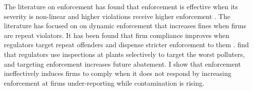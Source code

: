 \documentclass[12pt]{article}
\begin{document}

The literature on enforcement has found that enforcement is effective when its severity is non-linear and higher violations receive higher enforcement \parencite{harford1987self}. The literature has focused on on dynamic enforcement that increases fines when firms are repeat violators. It has been found that firm compliance improves when regulators target repeat offenders and dispense stricter enforcement to them \parencite{blundell2020escalation,blundell2020threats}. \cite{duflo2018value} find that regulators use inspections at plants selectively to target the worst polluters, and targeting enforcement increases future abatement. I show that enforcement ineffectively induces firms to comply when it does not respond by increasing enforcement at firms under-reporting while contamination is rising.





\end{document}
